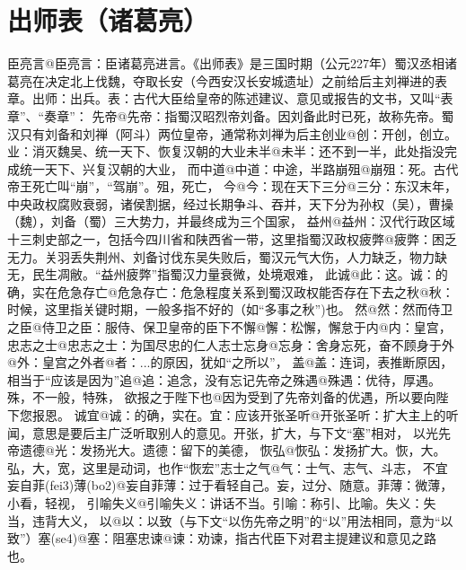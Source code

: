 \documentclass[a4paper]{article}
\newcommand{\comment}[1]{{\noindent\kaiti\large #1}}
\begin{document}
\section[]{出师表（\fangti 诸葛亮）}



臣亮言@{臣亮言：臣诸葛亮进言。《出师表》是三国时期（公元227年）蜀汉丞相诸葛亮在决定北上伐魏，夺取长安（今西安汉长安城遗址）之前给后主刘禅进的表章。出师：出兵。表：古代大臣给皇帝的陈述建议、意见或报告的文书，又叫“表章”、“奏章”}：
先帝@{先帝：指蜀汉昭烈帝刘备。因刘备此时已死，故称先帝。蜀汉只有刘备和刘禅（阿斗）两位皇帝，通常称刘禅为后主}创业@{创：开创，创立。业：消灭魏吴、统一天下、恢复汉朝的大业}未半@{未半：还不到一半，此处指没完成统一天下、兴复汉朝的大业}，
而中道@{中道：中途，半路}崩殂@{崩殂：死。古代帝王死亡叫“崩”，“驾崩”。殂，死亡}，
今@{今：现在}天下三分@{三分：东汉末年，中央政权腐败衰弱，诸侯割据，经过长期争斗、吞并，天下分为孙权（吴），曹操（魏），刘备（蜀）三大势力，并最终成为三个国家}，
益州@{益州：汉代行政区域十三刺史部之一，包括今四川省和陕西省一带，这里指蜀汉政权}疲弊@{疲弊：困乏无力。关羽丢失荆州、刘备讨伐东吴失败后，蜀汉元气大伤，人力缺乏，物力缺无，民生凋敝。“益州疲弊”指蜀汉力量衰微，处境艰难}，
此诚@{此：这。诚：的确，实在}危急存亡@{危急存亡：危急程度关系到蜀汉政权能否存在下去}之秋@{秋：时候，这里指关键时期，一般多指不好的（如“多事之秋”)}也。
然@{然：然而}侍卫之臣@{侍卫之臣：服侍、保卫皇帝的臣下}不懈@{懈：松懈，懈怠}于内@{内：皇宫}，
忠志之士@{忠志之士：为国尽忠的仁人志士}忘身@{忘身：舍身忘死，奋不顾身}于外@{外：皇宫之外}者@{者：...的原因，犹如“之所以”}，
盖@{盖：连词，表推断原因，相当于“应该是因为”}追@{追：追念，没有忘记}先帝之殊遇@{殊遇：优待，厚遇。殊，不一般，特殊}，
欲报之于陛下也@{因为受到了先帝刘备的优遇，所以要向陛下您报恩}。
诚宜@{诚：的确，实在。宜：应该}开张圣听@{开张圣听：扩大主上的听闻，意思是要后主广泛听取别人的意见。开张，扩大，与下文“塞”相对}，
以光先帝遗德@{光：发扬光大。遗德：留下的美德}，
恢弘@{恢弘：发扬扩大。恢，大。弘，大，宽，这里是动词，也作“恢宏”}志士之气@{气：士气、志气、斗志}，
不宜妄自菲(fei3)薄(bo2)@{妄自菲薄：过于看轻自己。妄，过分、随意。菲薄：微薄，小看，轻视}，
引喻失义@{引喻失义：讲话不当。引喻：称引、比喻。失义：失当，违背大义}，
以@{以：以致（与下文“以伤先帝之明”的“以”用法相同，意为“以致”）}塞(se4)@{塞：阻塞}忠谏@{谏：劝谏，指古代臣下对君主提建议和意见}之路也。
\end{document}
